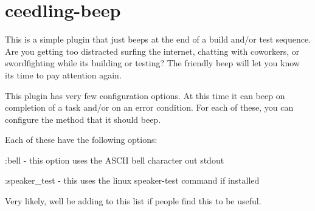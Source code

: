 \chapter{ceedling-\/beep}
\hypertarget{md__unit_test_framework_2vendor_2ceedling_2plugins_2beep_2_r_e_a_d_m_e}{}\label{md__unit_test_framework_2vendor_2ceedling_2plugins_2beep_2_r_e_a_d_m_e}
This is a simple plugin that just beeps at the end of a build and/or test sequence. Are you getting too distracted surfing the internet, chatting with coworkers, or swordfighting while it\textquotesingle{}s building or testing? The friendly beep will let you know it\textquotesingle{}s time to pay attention again.

This plugin has very few configuration options. At this time it can beep on completion of a task and/or on an error condition. For each of these, you can configure the method that it should beep.


\begin{DoxyCode}{0}

\end{DoxyCode}


Each of these have the following options\+:


\begin{DoxyItemize}
\item \+:bell -\/ this option uses the ASCII bell character out stdout
\item \+:speaker\+\_\+test -\/ this uses the linux speaker-\/test command if installed
\end{DoxyItemize}

Very likely, we\textquotesingle{}ll be adding to this list if people find this to be useful. 